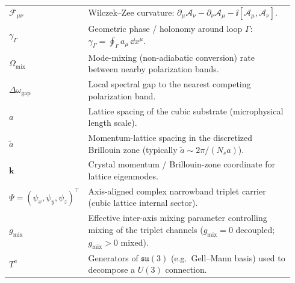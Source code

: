 \begin{center}
\begin{tabular}{p{0.22\linewidth} p{0.72\linewidth}}
$\mathcal{F}_{\mu\nu}$ & Wilczek--Zee curvature: $\partial_\mu\mathcal{A}_\nu-\partial_\nu\mathcal{A}_\mu-\ii[\mathcal{A}_\mu,\mathcal{A}_\nu]$.\\
$\gamma_\Gamma$ & Geometric phase / holonomy around loop $\Gamma$: $\gamma_\Gamma=\oint_\Gamma a_\mu\,\dd x^\mu$.\\
$\Omega_{\mathrm{mix}}$ & Mode-mixing (non-adiabatic conversion) rate between nearby polarization bands.\\
$\Delta\omega_{\mathrm{gap}}$ & Local spectral gap to the nearest competing polarization band.\\
$a$ & Lattice spacing of the cubic substrate (microphysical length scale).\\
$\tilde a$ & Momentum-lattice spacing in the discretized Brillouin zone (typically $\tilde a\sim 2\pi/(N_sa)$).\\
$\mathbf{k}$ & Crystal momentum / Brillouin-zone coordinate for lattice eigenmodes.\\
$\Psi=(\psi_x,\psi_y,\psi_z)^\top$ & Axis-aligned complex narrowband triplet carrier (cubic lattice internal sector).\\
$g_{\mathrm{mix}}$ & Effective inter-axis mixing parameter controlling mixing of the triplet channels ($g_{\mathrm{mix}}=0$ decoupled; $g_{\mathrm{mix}}>0$ mixed).\\
$T^a$ & Generators of $\mathfrak{su}(3)$ (e.g.\ Gell--Mann basis) used to decompose a $U(3)$ connection.\\
\end{tabular}
\end{center}
